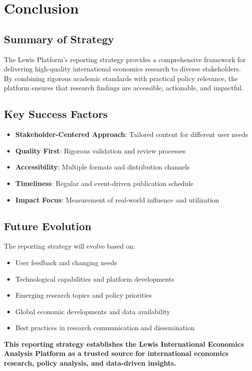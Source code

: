 \documentclass[11pt,a4paper]{article}
\begin{document}
\section{Conclusion}

\subsection{Summary of Strategy}
The Lewis Platform's reporting strategy provides a comprehensive framework for delivering high-quality international economics research to diverse stakeholders. By combining rigorous academic standards with practical policy relevance, the platform ensures that research findings are accessible, actionable, and impactful.

\subsection{Key Success Factors}
\begin{itemize}
    \item \textbf{Stakeholder-Centered Approach}: Tailored content for different user needs
    \item \textbf{Quality First}: Rigorous validation and review processes
    \item \textbf{Accessibility}: Multiple formats and distribution channels
    \item \textbf{Timeliness}: Regular and event-driven publication schedule
    \item \textbf{Impact Focus}: Measurement of real-world influence and utilization
\end{itemize}

\subsection{Future Evolution}
The reporting strategy will evolve based on:

\begin{itemize}
    \item User feedback and changing needs
    \item Technological capabilities and platform developments
    \item Emerging research topics and policy priorities
    \item Global economic developments and data availability
    \item Best practices in research communication and dissemination
\end{itemize}

\begin{center}
\textbf{\large This reporting strategy establishes the Lewis International Economics Analysis Platform as a trusted source for international economics research, policy analysis, and data-driven insights.}
\end{center}
\end{document}
